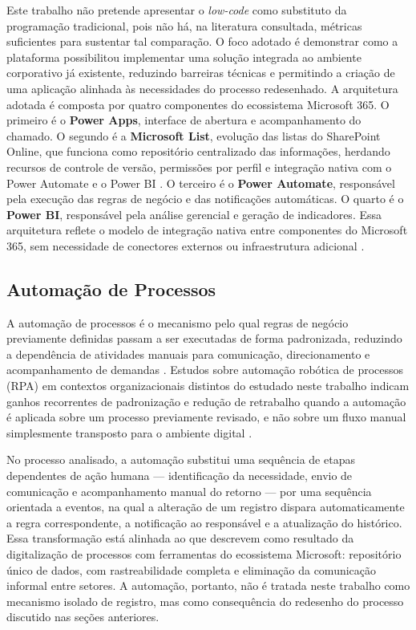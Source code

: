 Este trabalho não pretende apresentar o \textit{low-code}
como substituto da programação tradicional, pois não há, na
literatura consultada, métricas suficientes para sustentar
tal comparação. O foco adotado é demonstrar como a plataforma
possibilitou implementar uma solução integrada ao ambiente
corporativo já existente, reduzindo barreiras técnicas e
permitindo a criação de uma aplicação alinhada às
necessidades do processo redesenhado. A arquitetura adotada é
composta por quatro componentes do ecossistema Microsoft 365.
O primeiro é o \textbf{Power Apps}, interface de abertura e
acompanhamento do chamado. O segundo é a \textbf{Microsoft
List}, evolução das listas do SharePoint Online, que funciona
como repositório centralizado das informações, herdando
recursos de controle de versão, permissões por perfil e
integração nativa com o Power Automate e o Power BI
\cite{Mendes2024}. O terceiro é o \textbf{Power Automate},
responsável pela execução das regras de negócio e das
notificações automáticas. O quarto é o \textbf{Power BI},
responsável pela análise gerencial e geração de indicadores.
Essa arquitetura reflete o modelo de integração nativa entre
componentes do Microsoft 365, sem necessidade de conectores
externos ou infraestrutura adicional \cite{Costa2022}.

\subsection{Automação de Processos}

A automação de processos é o mecanismo pelo qual regras de
negócio previamente definidas passam a ser executadas de
forma padronizada, reduzindo a dependência de atividades
manuais para comunicação, direcionamento e acompanhamento de
demandas \cite{ReisFaria2024}. Estudos sobre automação
robótica de processos (RPA) em contextos organizacionais
distintos do estudado neste trabalho indicam ganhos
recorrentes de padronização e redução de retrabalho quando a
automação é aplicada sobre um processo previamente revisado,
e não sobre um fluxo manual simplesmente transposto para o
ambiente digital \cite{ReisFaria2024}.

No processo analisado, a automação substitui uma sequência de
etapas dependentes de ação humana --- identificação da
necessidade, envio de comunicação e acompanhamento manual do
retorno --- por uma sequência orientada a eventos, na qual a
alteração de um registro dispara automaticamente a regra
correspondente, a notificação ao responsável e a atualização
do histórico. Essa transformação está alinhada ao que
\cite{Lopes2024} descrevem como resultado da digitalização de
processos com ferramentas do ecossistema Microsoft: repositório
único de dados, com rastreabilidade completa e eliminação da
comunicação informal entre setores. A automação, portanto, não
é tratada neste trabalho como mecanismo isolado de registro,
mas como consequência do redesenho do processo discutido nas
seções anteriores.

